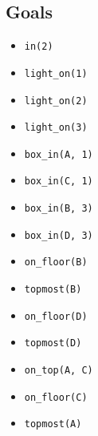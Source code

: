 \documentclass[12pt]{article}
\begin{document}
\subsection{Goals}
\begin{itemize}
  \item \texttt{in(2)}
  \item \texttt{light\_on(1)}
  \item \texttt{light\_on(2)}
  \item \texttt{light\_on(3)}
  \item \texttt{box\_in(A, 1)}
  \item \texttt{box\_in(C, 1)}
  \item \texttt{box\_in(B, 3)}
  \item \texttt{box\_in(D, 3)}
  \item \texttt{on\_floor(B)}
  \item \texttt{topmost(B)}
  \item \texttt{on\_floor(D)}
  \item \texttt{topmost(D)}
  \item \texttt{on\_top(A, C)}
  \item \texttt{on\_floor(C)}
  \item \texttt{topmost(A)}
\end{itemize}
\end{document}
